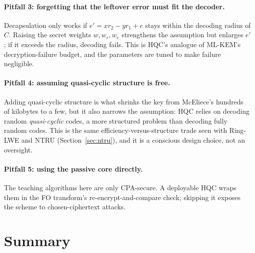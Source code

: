 \paragraph{Pitfall 3: forgetting that the leftover error must fit the decoder.} Decapsulation only works if $e' = x r_2 - y r_1 + e$ stays within the decoding radius of $C$. Raising the secret weights $w, w_r, w_e$ strengthens the assumption but enlarges $e'$; if it exceeds the radius, decoding fails. This is HQC's analogue of ML-KEM's decryption-failure budget, and the parameters are tuned to make failure negligible.

\paragraph{Pitfall 4: assuming quasi-cyclic structure is free.} Adding quasi-cyclic structure is what shrinks the key from McEliece's hundreds of kilobytes to a few, but it also narrows the assumption: HQC relies on decoding random \emph{quasi-cyclic} codes, a more structured problem than decoding fully random codes. This is the same efficiency-versus-structure trade seen with Ring-LWE and NTRU (Section~\ref{sec:ntru}), and it is a conscious design choice, not an oversight.

\paragraph{Pitfall 5: using the passive core directly.} The teaching algorithms here are only CPA-secure. A deployable HQC wraps them in the FO transform's re-encrypt-and-compare check; skipping it exposes the scheme to chosen-ciphertext attacks.

\section{Summary}

